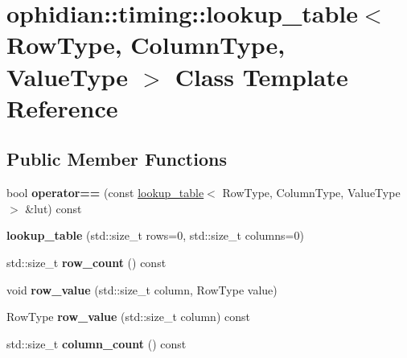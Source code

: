 \hypertarget{classophidian_1_1timing_1_1lookup__table}{\section{ophidian\-:\-:timing\-:\-:lookup\-\_\-table$<$ Row\-Type, Column\-Type, Value\-Type $>$ Class Template Reference}
\label{classophidian_1_1timing_1_1lookup__table}
}
\subsection*{Public Member Functions}
\begin{DoxyCompactItemize}
\item 
\hypertarget{classophidian_1_1timing_1_1lookup__table_a790786f69144bb422312de396bec884a}{bool {\bfseries operator==} (const \hyperlink{classophidian_1_1timing_1_1lookup__table}{lookup\-\_\-table}$<$ Row\-Type, Column\-Type, Value\-Type $>$ \&lut) const }\label{classophidian_1_1timing_1_1lookup__table_a790786f69144bb422312de396bec884a}

\item 
\hypertarget{classophidian_1_1timing_1_1lookup__table_a1be35117499fcf775350151b1e577f73}{{\bfseries lookup\-\_\-table} (std\-::size\-\_\-t rows=0, std\-::size\-\_\-t columns=0)}\label{classophidian_1_1timing_1_1lookup__table_a1be35117499fcf775350151b1e577f73}

\item 
\hypertarget{classophidian_1_1timing_1_1lookup__table_a8806b36f38ab82aba3e116f2e4b5b0d3}{std\-::size\-\_\-t {\bfseries row\-\_\-count} () const }\label{classophidian_1_1timing_1_1lookup__table_a8806b36f38ab82aba3e116f2e4b5b0d3}

\item 
\hypertarget{classophidian_1_1timing_1_1lookup__table_af5e04477ddba7bc30674a74c08b0846a}{void {\bfseries row\-\_\-value} (std\-::size\-\_\-t column, Row\-Type value)}\label{classophidian_1_1timing_1_1lookup__table_af5e04477ddba7bc30674a74c08b0846a}

\item 
\hypertarget{classophidian_1_1timing_1_1lookup__table_a94ffb4f93bee585ea2f79537617fe7a4}{Row\-Type {\bfseries row\-\_\-value} (std\-::size\-\_\-t column) const }\label{classophidian_1_1timing_1_1lookup__table_a94ffb4f93bee585ea2f79537617fe7a4}

\item 
\hypertarget{classophidian_1_1timing_1_1lookup__table_a0cfe6a08e5b434543e86a72f1b5d48de}{std\-::size\-\_\-t {\bfseries column\-\_\-count} () const }\label{classophidian_1_1timing_1_1lookup__table_a0cfe6a08e5b434543e86a72f1b5d48de}


\end{DoxyCompactItemize}
